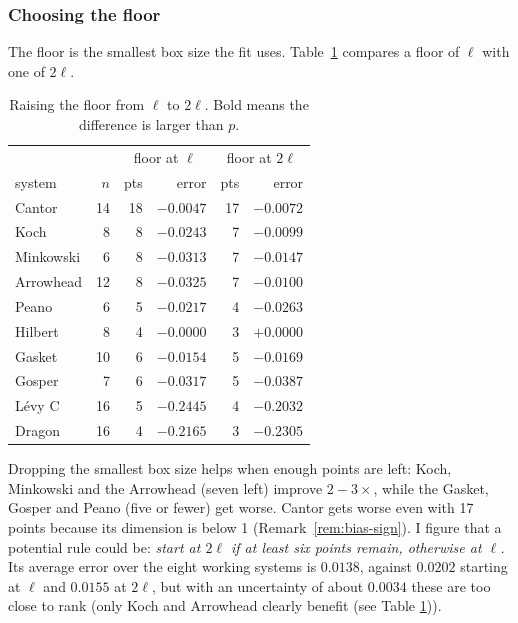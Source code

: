 \documentclass[11pt, a4paper]{article}
\theoremstyle{plain}
\theoremstyle{definition}
\theoremstyle{remark}
\begin{document}
\subsubsection{Choosing the floor}
\label{sec:floor}

The floor is the smallest box size the fit uses. Table~\ref{tab:floor} compares a floor of $\ell$ with one of $2\ell$.

\begin{table}[H]
\centering
\begin{tabular}{lrrrrr}
\hline
 & & \multicolumn{2}{c}{floor at $\ell$} & \multicolumn{2}{c}{floor at $2\ell$} \\
system & $n$ & pts & error & pts & error \\
\hline
Cantor    & 14 & 18 & $-0.0047$ & 17 & $-0.0072$ \\
Koch      &  8 &  8 & $-0.0243$ &  7 & $\mathbf{-0.0099}$ \\
Minkowski &  6 &  8 & $-0.0313$ &  7 & $-0.0147$ \\
Arrowhead & 12 &  8 & $-0.0325$ &  7 & $\mathbf{-0.0100}$ \\
Peano     &  6 &  5 & $-0.0217$ &  4 & $-0.0263$ \\
Hilbert   &  8 &  4 & $-0.0000$ &  3 & $+0.0000$ \\
Gasket    & 10 &  6 & $-0.0154$ &  5 & $-0.0169$ \\
Gosper    &  7 &  6 & $-0.0317$ &  5 & $-0.0387$ \\
L\'evy C  & 16 &  5 & $-0.2445$ &  4 & $-0.2032$ \\
Dragon    & 16 &  4 & $-0.2165$ &  3 & $-0.2305$ \\
\hline
\end{tabular}
\caption{Raising the floor from $\ell$ to $2\ell$. Bold means the difference is larger than $p$.}
\label{tab:floor}
\end{table}

\noindent Dropping the smallest box size helps when enough points are left:
Koch, Minkowski and the Arrowhead (seven left) improve $2-3\times$, while
the Gasket, Gosper and Peano (five or fewer) get worse. Cantor gets worse even
with 17 points because its dimension is below 1 (Remark~\ref{rem:bias-sign}). 
I figure that a potential rule could be: \emph{start at $2\ell$ if at least six points remain, otherwise at $\ell$.} 
Its average error over the eight working systems is $0.0138$, against $0.0202$ starting at $\ell$ and $0.0155$
at $2\ell$, but with an uncertainty of about $0.0034$ these are too close to rank (only Koch and Arrowhead clearly benefit (see Table \ref{tab:floor})).
\end{document}
